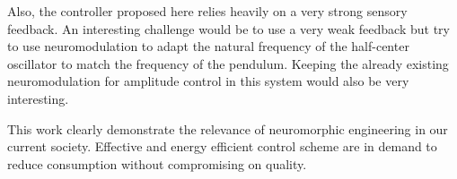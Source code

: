 Also, the controller proposed here relies heavily on a very strong sensory feedback. An interesting challenge would be to use a very weak feedback but try to use neuromodulation to adapt the natural frequency of the half-center oscillator to match the frequency of the pendulum. 
Keeping the already existing neuromodulation for amplitude control in this system would also be very interesting.


This work clearly demonstrate the relevance of neuromorphic engineering in our current society.
Effective and energy efficient control scheme are in demand to reduce consumption without compromising on quality.



%
